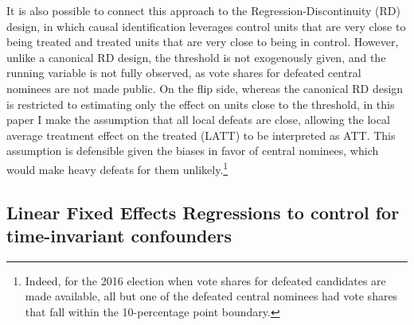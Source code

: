 \documentclass[12pt]{article}\usepackage[]{graphicx}\usepackage[]{color}
\newcommand{\1}{\mathbbm{1}}
\begin{document}
It is also possible to connect this approach to the Regression-Discontinuity (RD) design, in which causal identification leverages control units that are very close to being treated and treated units that are very close to being in control. However, unlike a canonical RD design, the threshold is not exogenously given, and the running variable is not fully observed, as vote shares for defeated central nominees are not made public. On the flip side, whereas the canonical RD design is restricted to estimating only the effect on units close to the threshold, in this paper I make the assumption that all local defeats are close, allowing the local average treatment effect on the treated (LATT) to be interpreted as ATT. This assumption is defensible given the biases in favor of central nominees, which would make heavy defeats for them unlikely.\footnote{Indeed, for the 2016 election when vote shares for defeated candidates are made available, all but one of the defeated central nominees had vote shares that fall within the 10-percentage point boundary. }

\subsection{Linear Fixed Effects Regressions to control for time-invariant confounders}
\label{sec:FE}
\end{document}
